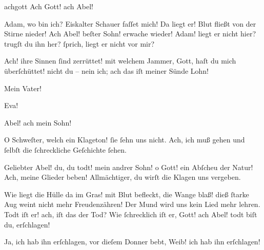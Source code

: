 \documentclass[tocstyle=ref-genre]{ees}
\begin{document}
{\begin{movement}{achgott}
  \voice[Adam]
  Ach Gott! ach Abel!

  \voice[Eva]
  Adam, wo bin ich?
  Eiskalter Schauer faſſet mich!
  Da liegt er!
  Blut fließt von der Stirne nieder!
  Ach Abel! beſter Sohn! erwache wieder!
  Adam! liegt er nicht hier?
  trugſt du ihn her?
  ſprich, liegt er nicht vor mir?

  \voice[Adam]
  Ach! ihre Sinnen ſind zerrüttet!
  mit welchem Jammer, Gott,
  haſt du mich überſchüttet!
  nicht du – nein ich;
  ach das iſt meiner Sünde Lohn!

  \voice[Thirza]
  Mein Vater!

  \voice[Mehala]
  Eva!

  \voice[Eva]
  Abel! ach mein Sohn!

  \voice[Thirza]
  O Schweſter, welch ein Klageton!
  ſie ſehn uns nicht. Ach, ich muß gehen
  und ſelbſt die ſchreckliche Geſchichte ſehen.

  \voice[Adam]
  Geliebter Abel! du, du todt!
  mein andrer Sohn! o Gott!
  ein Abſcheu der Natur!
  Ach, meine Glieder beben!
  Allmächtiger, du wirſt die Klagen uns vergeben.

  \voice[Eva]
  Wie liegt die Hülle da im Gras!
  mit Blut befleckt, die Wange blaß!
  dieß ſtarke Aug weint nicht mehr Freudenzähren!
  Der Mund wird uns kein Lied mehr lehren.
  Todt iſt er! ach, iſt das der Tod?
  Wie ſchrecklich iſt er, Gott!
  ach Abel! todt biſt du, erſchlagen!

  \voice[Kain]
  Ja, ich hab ihn erſchlagen,
  vor dieſem Donner bebt,
  Weib! ich hab ihn erſchlagen!
\end{movement}


}

\eesScore
\end{document}
